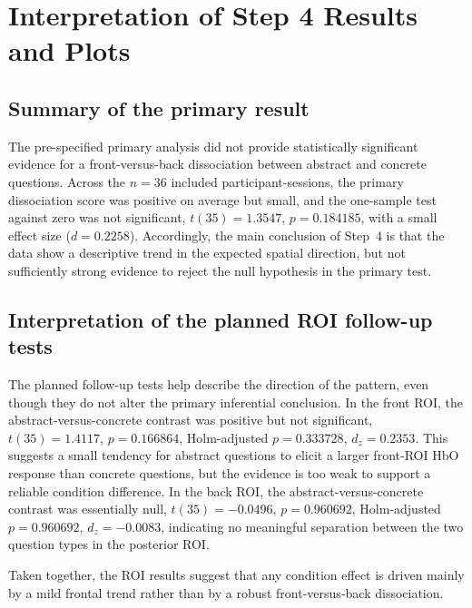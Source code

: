 
\section{Interpretation of Step 4 Results and Plots}
\label{sec:step4_interpretation}

\subsection{Summary of the primary result}
The pre-specified primary analysis did not provide statistically significant evidence for a
front-versus-back dissociation between abstract and concrete questions.
Across the $n=36$ included participant-sessions, the primary dissociation score was positive on
average but small, and the one-sample test against zero was not significant,
$t(35)=1.3547$, $p=0.184185$, with a small effect size ($d=0.2258$).
Accordingly, the main conclusion of Step~4 is that the data show a descriptive trend in the expected
spatial direction, but not sufficiently strong evidence to reject the null hypothesis in the primary test.

\subsection{Interpretation of the planned ROI follow-up tests}
The planned follow-up tests help describe the direction of the pattern, even though they do not alter
the primary inferential conclusion.
In the front ROI, the abstract-versus-concrete contrast was positive but not significant,
$t(35)=1.4117$, $p=0.166864$, Holm-adjusted $p=0.333728$, $d_z=0.2353$.
This suggests a small tendency for abstract questions to elicit a larger front-ROI HbO response than
concrete questions, but the evidence is too weak to support a reliable condition difference.
In the back ROI, the abstract-versus-concrete contrast was essentially null,
$t(35)=-0.0496$, $p=0.960692$, Holm-adjusted $p=0.960692$, $d_z=-0.0083$,
indicating no meaningful separation between the two question types in the posterior ROI.

Taken together, the ROI results suggest that any condition effect is driven mainly by a mild frontal
trend rather than by a robust front-versus-back dissociation.


